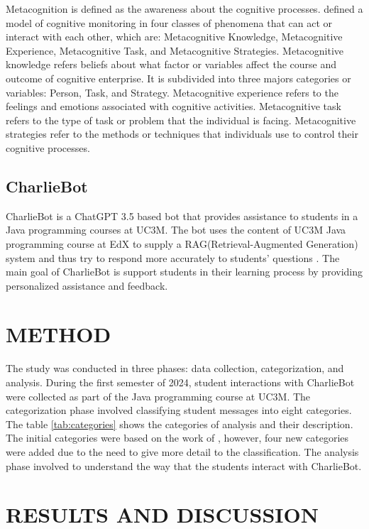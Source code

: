 \documentclass[a4paper,twoside]{article}
\begin{document}
Metacognition is defined as the awareness about the cognitive processes.
\cite{flavell79} defined a model of cognitive monitoring in four classes of
phenomena that can act or interact with each other, which are: Metacognitive
Knowledge, Metacognitive Experience, Metacognitive Task, and Metacognitive
Strategies. Metacognitive knowledge refers beliefs about what factor or
variables affect the course and outcome of cognitive enterprise. It is
subdivided into three majors categories or variables: Person, Task, and
Strategy. Metacognitive experience refers to the feelings and emotions
associated with cognitive activities. Metacognitive task refers to the type of
task or problem that the individual is facing. Metacognitive strategies refer to
the methods or techniques that individuals use to control their cognitive
processes.


\subsection{CharlieBot}

CharlieBot is a ChatGPT 3.5 based bot that provides assistance to students in a
Java programming courses at UC3M. The bot uses the content of UC3M Java
programming course at EdX to supply a RAG(Retrieval-Augmented Generation) system
and thus try to respond more accurately to students' questions \cite{Sun24}. The
main goal of CharlieBot is support students in their learning process by
providing personalized assistance and feedback.

\section{\uppercase{Method}}

The study was conducted in three phases: data collection, categorization, and
analysis. During the first semester of 2024, student interactions with
CharlieBot were collected as part of the Java programming course at UC3M.
The categorization phase involved classifying student messages into eight
categories. The table \ref{tab:categories} shows the categories of analysis and
their description. The initial categories were based on the work of
\cite{Ghimire24}, however, four new categories were added due to the need to
give more detail to the classification. The analysis phase involved to
understand the way that the students interact with CharlieBot.
\section{\uppercase{Results and Discussion}}
\end{document}
